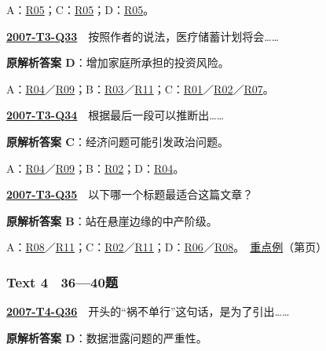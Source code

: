 \documentclass[11pt,a4paper]{article}
\begin{document}
\noindent A：\hyperref[cat-R05]{R05}；C：\hyperref[cat-R05]{R05}；D：\hyperref[cat-R05]{R05}。\par\smallskip
{}\label{idx-2007-T3-Q33}\noindent\textbf{\href{https://zj139.github.io/math-notes/english/346f4d489f00121c1d163691/\#q33}{2007-T3-Q33}}　按照作者的说法，医疗储蓄计划将会……\par\nopagebreak
\noindent\textbf{原解析答案 D}：增加家庭所承担的投资风险。\par\nopagebreak
\noindent A：\hyperref[cat-R04]{R04}／\hyperref[cat-R09]{R09}；B：\hyperref[cat-R03]{R03}／\hyperref[cat-R11]{R11}；C：\hyperref[cat-R01]{R01}／\hyperref[cat-R02]{R02}／\hyperref[cat-R07]{R07}。\par\smallskip
{}\label{idx-2007-T3-Q34}\noindent\textbf{\href{https://zj139.github.io/math-notes/english/346f4d489f00121c1d163691/\#q34}{2007-T3-Q34}}　根据最后一段可以推断出……\par\nopagebreak
\noindent\textbf{原解析答案 C}：经济问题可能引发政治问题。\par\nopagebreak
\noindent A：\hyperref[cat-R04]{R04}／\hyperref[cat-R09]{R09}；B：\hyperref[cat-R02]{R02}；D：\hyperref[cat-R04]{R04}。\par\smallskip
{}\label{idx-2007-T3-Q35}\noindent\textbf{\href{https://zj139.github.io/math-notes/english/346f4d489f00121c1d163691/\#q35}{2007-T3-Q35}}　以下哪一个标题最适合这篇文章？\par\nopagebreak
\noindent\textbf{原解析答案 B}：站在悬崖边缘的中产阶级。\par\nopagebreak
\noindent A：\hyperref[cat-R08]{R08}／\hyperref[cat-R11]{R11}；C：\hyperref[cat-R02]{R02}／\hyperref[cat-R11]{R11}；D：\hyperref[cat-R06]{R06}／\hyperref[cat-R08]{R08}。　\hyperref[case-2007-T3-Q35]{重点例}（第\pageref{case-2007-T3-Q35}页）\par\smallskip
{}\subsubsection{Text 4　36—40题}
\label{idx-2007-T4-Q36}\noindent\textbf{\href{https://zj139.github.io/math-notes/english/4583f11cfad63caee815e722/\#q36}{2007-T4-Q36}}　开头的“祸不单行”这句话，是为了引出……\par\nopagebreak
\noindent\textbf{原解析答案 D}：数据泄露问题的严重性。\par\nopagebreak
\end{document}
